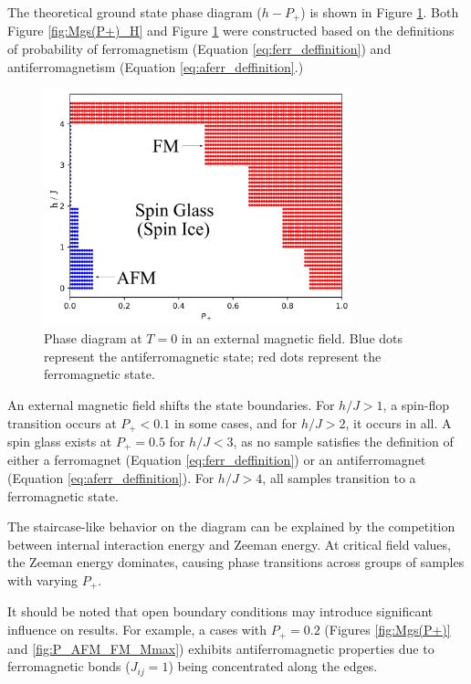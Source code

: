 \documentclass[preprint,12pt]{elsarticle}
\begin{document}
	The theoretical ground state phase diagram ($h-P_+$) is shown in Figure \ref{fig:P+_afm_fm(H)}. Both Figure \ref{fig:Mgs(P+)_H} and Figure \ref{fig:P+_afm_fm(H)} were constructed based on the definitions of probability of ferromagnetism (Equation \eqref{eq:ferr_deffinition}) and antiferromagnetism (Equation \eqref{eq:aferr_deffinition}.)
	
	\begin{figure}[H]
		\centering
		\includegraphics[width=0.8\textwidth]{images/P+_afm_fm(H)_filled.png}
		\caption{Phase diagram at $T = 0$ in an external magnetic field. Blue dots represent the antiferromagnetic state; red dots represent the ferromagnetic state.}
		\label{fig:P+_afm_fm(H)}
	\end{figure}
	
	An external magnetic field shifts the state boundaries. For $h/J > 1$, a spin-flop transition occurs at $P_+ < 0.1$ in some cases, and for $h/J > 2$, it occurs in all. A spin glass exists at $P_+ = 0.5$ for $h/J < 3$, as no sample satisfies the definition of either a ferromagnet (Equation \eqref{eq:ferr_deffinition}) or an antiferromagnet (Equation \eqref{eq:aferr_deffinition}). For $h/J > 4$, all samples transition to a ferromagnetic state. 
	
	The staircase-like behavior on the diagram can be explained by the competition between internal interaction energy and Zeeman energy. At critical field values, the Zeeman energy dominates, causing phase transitions across groups of samples with varying $P_+$.
	
	It should be noted that open boundary conditions may introduce significant influence on results. For example, a cases with $P_+ = 0.2$ (Figures \ref{fig:Mgs(P+)} and \ref{fig:P_AFM_FM_Mmax}) exhibits antiferromagnetic properties due to ferromagnetic bonds ($J_{ij} = 1$) being concentrated along the edges.
	
\end{document}
